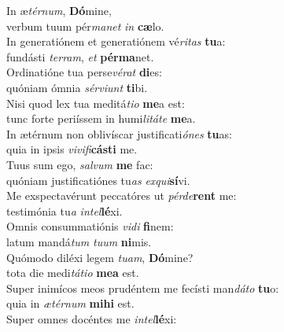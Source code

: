 \oddverse In æ\textit{tér}\textit{num}, \textbf{Dó}mine,~\*\\
\oddverse verbum tuum pér\textit{ma}\textit{net} \textit{in} \textbf{cæ}lo.\\
\evenverse In generatiónem et generatiónem vé\textit{ri}\textit{tas} \textbf{tu}a:~\*\\
\evenverse fundásti \textit{ter}\textit{ram}, \textit{et} \textbf{pér}\textbf{ma}net.\\
\oddverse Ordinatióne tua perse\textit{vé}\textit{rat} \textbf{di}es:~\*\\
\oddverse quóniam ómnia \textit{sér}\textit{vi}\textit{unt} \textbf{ti}bi.\\
\evenverse Nisi quod lex tua meditá\textit{ti}\textit{o} \textbf{me}a est:~\*\\
\evenverse tunc forte periíssem in humi\textit{li}\textit{tá}\textit{te} \textbf{me}a.\\
\oddverse In ætérnum non oblivíscar justificati\textit{ó}\textit{nes} \textbf{tu}as:~\*\\
\oddverse quia in ipsis \textit{vi}\textit{vi}\textit{fi}\textbf{cá}\textbf{sti} me.\\
\evenverse Tuus sum ego, \textit{sal}\textit{vum} \textbf{me} fac:~\*\\
\evenverse quóniam justificatiónes tu\textit{as} \textit{ex}\textit{qui}\textbf{sí}vi.\\
\oddverse Me exspectavérunt peccatóres ut \textit{pér}\textit{de}\textbf{rent} me:~\*\\
\oddverse testimónia tu\textit{a} \textit{in}\textit{tel}\textbf{lé}xi.\\
\evenverse Omnis consummatiónis \textit{vi}\textit{di} \textbf{fi}nem:~\*\\
\evenverse latum mandá\textit{tum} \textit{tu}\textit{um} \textbf{ni}mis.\\
\oddverse Quómodo diléxi legem \textit{tu}\textit{am}, \textbf{Dó}mine?~\*\\
\oddverse tota die medi\textit{tá}\textit{ti}\textit{o} \textbf{me}\textbf{a} est.\\
\evenverse Super inimícos meos prudéntem me fecísti man\textit{dá}\textit{to} \textbf{tu}o:~\*\\
\evenverse quia in \textit{æ}\textit{tér}\textit{num} \textbf{mi}\textbf{hi} est.\\
\oddverse Super omnes docéntes me \textit{in}\textit{tel}\textbf{lé}xi:~\*\\
